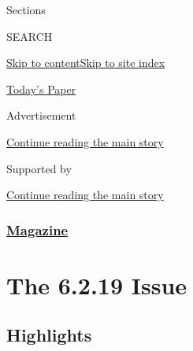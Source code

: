 Sections

SEARCH

\protect\hyperlink{site-content}{Skip to
content}\protect\hyperlink{site-index}{Skip to site index}

\href{https://myaccount.nytimes3xbfgragh.onion/auth/login?response_type=cookie\&client_id=vi}{}

\href{https://www.nytimes3xbfgragh.onion/section/todayspaper}{Today's
Paper}

Advertisement

\protect\hyperlink{after-top}{Continue reading the main story}

Supported by

\protect\hyperlink{after-sponsor}{Continue reading the main story}

\hypertarget{magazine}{%
\subsubsection{\texorpdfstring{\href{/section/magazine}{Magazine}}{Magazine}}\label{magazine}}

\hypertarget{the-6219-issue}{%
\section{The 6.2.19 Issue}\label{the-6219-issue}}

\hypertarget{highlights}{%
\subsection{Highlights}\label{highlights}}

